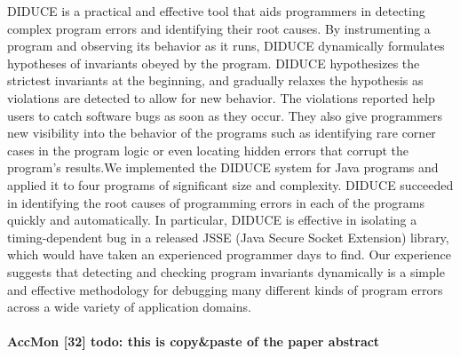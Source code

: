 DIDUCE is a practical and effective tool that aids programmers in detecting complex program errors and identifying their root causes. By instrumenting a program and observing its behavior as it runs, DIDUCE dynamically formulates hypotheses of invariants obeyed by the program. DIDUCE hypothesizes the strictest invariants at the beginning, and gradually relaxes the hypothesis as violations are detected to allow for new behavior. The violations reported help users to catch software bugs as soon as they occur. They also give programmers new visibility into the behavior of the programs such as identifying rare corner cases in the program logic or even locating hidden errors that corrupt the program's results.We implemented the DIDUCE system for Java programs and applied it to four programs of significant size and complexity. DIDUCE succeeded in identifying the root causes of programming errors in each of the programs quickly and automatically. In particular, DIDUCE is effective in isolating a timing-dependent bug in a released JSSE (Java Secure Socket Extension) library, which would have taken an experienced programmer days to find. Our experience suggests that detecting and checking program invariants dynamically is a simple and effective methodology for debugging many different kinds of program errors across a wide variety of application domains.
\\
\\
\textbf{AccMon [32] todo: this is copy\&paste of the paper abstract}

